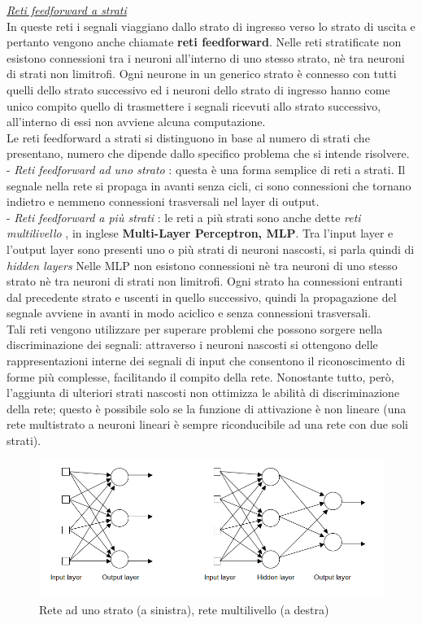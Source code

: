 \documentclass[12pt,a4paper,oneside]{book}
\begin{document}
		\underline{\emph{Reti feedforward a strati}}\\
		In queste reti i segnali viaggiano dallo strato di ingresso verso lo strato di uscita e pertanto vengono anche chiamate \textbf{reti feedforward}. Nelle reti stratificate non esistono connessioni tra i neuroni all'interno di uno stesso strato, nè tra neuroni di strati non limitrofi. Ogni neurone in un generico strato è connesso con tutti quelli dello strato successivo ed i neuroni dello strato di ingresso hanno come unico compito quello di trasmettere i segnali ricevuti allo strato successivo, all'interno di essi non avviene alcuna computazione.\\
		Le reti feedforward a strati si distinguono in base al numero di strati che presentano, numero che dipende dallo specifico problema che si intende risolvere.\\ 
		- \emph{Reti feedforward ad uno strato} : questa è una forma semplice di reti a strati. Il segnale nella rete si propaga in avanti senza cicli, ci sono connessioni che tornano indietro e nemmeno connessioni trasversali nel layer di output.\\
		- \emph{Reti feedforward a più strati }: le reti a più strati sono anche dette \textit{reti multilivello }, in inglese \textbf{\textit{}Multi-Layer Perceptron, MLP}. Tra l'input layer e l'output layer sono presenti uno o più strati di neuroni nascosti, si parla quindi di \textit{\textit{hidden layers}} Nelle MLP non esistono connessioni nè tra neuroni di uno stesso strato nè tra neuroni di strati non limitrofi. Ogni strato ha connessioni entranti dal precedente strato e uscenti in quello successivo, quindi la propagazione del segnale avviene in avanti in modo aciclico e senza connessioni trasversali.\\
		Tali reti vengono utilizzare per superare problemi che possono sorgere nella discriminazione dei segnali: attraverso i neuroni nascosti si ottengono delle rappresentazioni interne dei segnali di input che consentono il riconoscimento di forme più complesse, facilitando il compito della rete. 
		Nonostante tutto, però, l’aggiunta di ulteriori strati nascosti non ottimizza le abilità di discriminazione della rete; questo è possibile solo se la funzione di attivazione è non lineare (una rete multistrato a neuroni lineari è sempre riconducibile ad una rete con due soli strati).\\ 
		
		\clearpage
		\begin{figure}[h]
			\centering
			\includegraphics[width=1\linewidth]{IMMAGINI/unostrato}
			\caption{Rete ad uno strato (a sinistra), rete multilivello (a destra)}
			\label{fig:multistrato}
		\end{figure}
	
\end{document}
